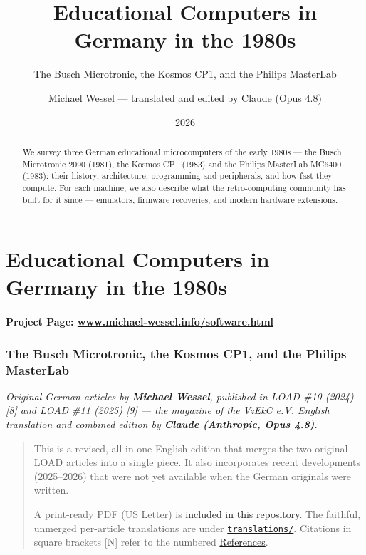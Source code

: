 \documentclass[
  11pt,
  letterpaper,
]{article}
\title{Educational Computers in Germany in the 1980s}
\subtitle{The Busch Microtronic, the Kosmos CP1, and the Philips MasterLab}
\author{Michael Wessel — translated and edited by Claude (Opus 4.8)}
\date{2026}
\begin{document}
\maketitle
\begin{abstract}
We survey three German educational microcomputers of the early 1980s — the Busch Microtronic 2090 (1981), the Kosmos CP1 (1983) and the Philips MasterLab MC6400 (1983): their history, architecture, programming and peripherals, and how fast they compute. For each machine, we also describe what the retro-computing community has built for it since — emulators, firmware recoveries, and modern hardware extensions.
\end{abstract}

\section{Educational Computers in Germany in the
1980s}\label{educational-computers-in-germany-in-the-1980s}

\paragraph{\texorpdfstring{Project Page:
\href{https://www.michael-wessel.info/software.html\#educational-computers-in-germany-in-the-1980s}{\href{http://www.michael-wessel.info/software.html}{www.michael-wessel.info/software.html}}}{Project Page: www.michael-wessel.info/software.html}}\label{project-page-wwwmichael-wesselinfosoftwarehtml}

\subsubsection{The Busch Microtronic, the Kosmos CP1, and the Philips
MasterLab}\label{the-busch-microtronic-the-kosmos-cp1-and-the-philips-masterlab}

\emph{Original German articles by \textbf{Michael Wessel}, published in
LOAD \#10 (2024) {[}8{]} and LOAD \#11 (2025) {[}9{]} --- the magazine
of the VzEkC e.V. English translation and combined edition by
\textbf{Claude (Anthropic, Opus 4.8)}.}

\begin{quote}
This is a revised, all-in-one English edition that merges the two
original LOAD articles into a single piece. It also incorporates recent
developments (2025--2026) that were not yet available when the German
originals were written.

A print-ready PDF (US Letter) is
\href{https://github.com/lambdamikel/german-educational-computers-of-the-80s/blob/main/educational-computers-in-germany-in-the-1980s.pdf}{included
in this repository}. The faithful, unmerged per-article translations are
under
\href{https://github.com/lambdamikel/german-educational-computers-of-the-80s/tree/main/translations/}{\texttt{translations/}}.
Citations in square brackets {[}N{]} refer to the numbered
\hyperref[references]{References}.
\end{quote}
\end{document}
